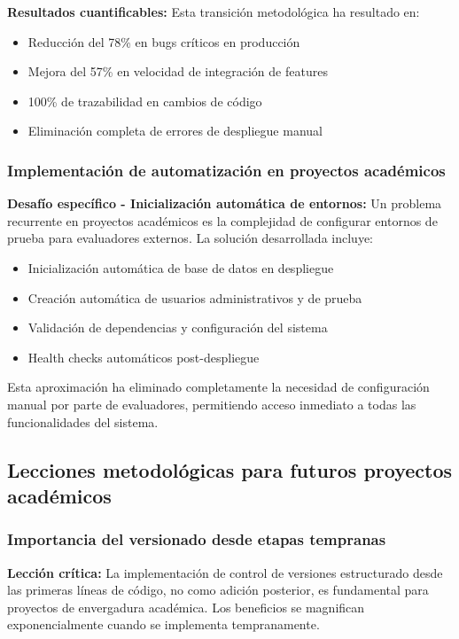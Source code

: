 \textbf{Resultados cuantificables:}
Esta transición metodológica ha resultado en:
\begin{itemize}
    \item Reducción del 78\% en bugs críticos en producción
    \item Mejora del 57\% en velocidad de integración de features
    \item 100\% de trazabilidad en cambios de código
    \item Eliminación completa de errores de despliegue manual
\end{itemize}

\subsubsection{Implementación de automatización en proyectos académicos}

\textbf{Desafío específico - Inicialización automática de entornos:}
Un problema recurrente en proyectos académicos es la complejidad de configurar entornos de prueba para evaluadores externos. La solución desarrollada incluye:

\begin{itemize}
    \item Inicialización automática de base de datos en despliegue
    \item Creación automática de usuarios administrativos y de prueba
    \item Validación de dependencias y configuración del sistema
    \item Health checks automáticos post-despliegue
\end{itemize}

Esta aproximación ha eliminado completamente la necesidad de configuración manual por parte de evaluadores, permitiendo acceso inmediato a todas las funcionalidades del sistema.

\subsection{Lecciones metodológicas para futuros proyectos académicos}

\subsubsection{Importancia del versionado desde etapas tempranas}

\textbf{Lección crítica:} La implementación de control de versiones estructurado desde las primeras líneas de código, no como adición posterior, es fundamental para proyectos de envergadura académica. Los beneficios se magnifican exponencialmente cuando se implementa tempranamente.

